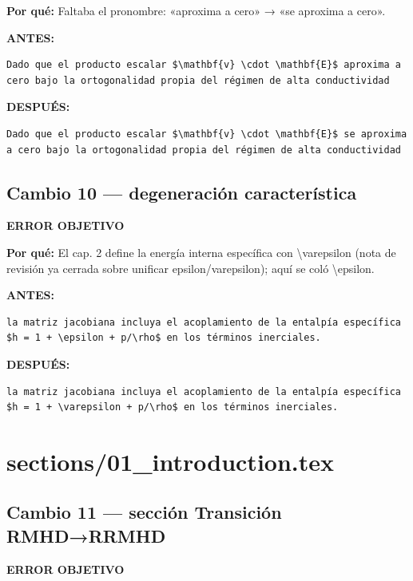 \documentclass[11pt,a4paper]{article}
\begin{document}
\textbf{Por qué:} Faltaba el pronombre: «aproxima a cero» → «se aproxima a cero».

\textcolor{antesline}{\textbf{ANTES:}}
\begin{Verbatim}[breaklines=true, breakanywhere=true, fontsize=\small, frame=leftline, rulecolor=\color{antesline}, framerule=1.2pt]
Dado que el producto escalar $\mathbf{v} \cdot \mathbf{E}$ aproxima a cero bajo la ortogonalidad propia del régimen de alta conductividad
\end{Verbatim}
\textcolor{despline}{\textbf{DESPUÉS:}}
\begin{Verbatim}[breaklines=true, breakanywhere=true, fontsize=\small, frame=leftline, rulecolor=\color{despline}, framerule=1.2pt]
Dado que el producto escalar $\mathbf{v} \cdot \mathbf{E}$ se aproxima a cero bajo la ortogonalidad propia del régimen de alta conductividad
\end{Verbatim}

\subsection*{Cambio 10 --- degeneración característica}
\colorbox{okbg}{\textbf{\footnotesize ERROR OBJETIVO}}

\textbf{Por qué:} El cap. 2 define la energía interna específica con \textbackslash{}varepsilon (nota de revisión ya cerrada sobre unificar epsilon/varepsilon); aquí se coló \textbackslash{}epsilon.

\textcolor{antesline}{\textbf{ANTES:}}
\begin{Verbatim}[breaklines=true, breakanywhere=true, fontsize=\small, frame=leftline, rulecolor=\color{antesline}, framerule=1.2pt]
la matriz jacobiana incluya el acoplamiento de la entalpía específica $h = 1 + \epsilon + p/\rho$ en los términos inerciales.
\end{Verbatim}
\textcolor{despline}{\textbf{DESPUÉS:}}
\begin{Verbatim}[breaklines=true, breakanywhere=true, fontsize=\small, frame=leftline, rulecolor=\color{despline}, framerule=1.2pt]
la matriz jacobiana incluya el acoplamiento de la entalpía específica $h = 1 + \varepsilon + p/\rho$ en los términos inerciales.
\end{Verbatim}


\section*{sections/01\_introduction.tex}
\subsection*{Cambio 11 --- sección Transición RMHD→RRMHD}
\colorbox{okbg}{\textbf{\footnotesize ERROR OBJETIVO}}
\end{document}
